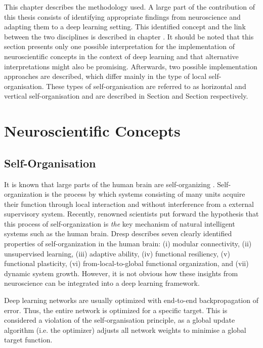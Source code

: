 This chapter describes the methodology used.
A large part of the contribution of this thesis consists of identifying appropriate findings from neuroscience and adapting them to a deep learning setting.
This identified concept and the link between the two disciplines is described in chapter .
It should be noted that this section presents only one possible interpretation for the implementation of neuroscientific concepts in the context of deep learning and that alternative interpretations might also be promising.
Afterwards, two possible implementation approaches are described, which differ mainly in the type of local self-organisation.
These types of self-organisation are referred to as horizontal and vertical self-organisation and are described in Section  and Section  respectively.




\section{Neuroscientific Concepts}

\subsection{Self-Organisation}
It is known that large parts of the human brain are self-organizing .
Self-organization is the process by which systems consisting of many units acquire their function through local interaction and without interference from a external supervisory system.
Recently, renowned scientists  put forward the hypothesis that this process of self-organization is \emph{the} key mechanism of natural intelligent systems such as the human brain.
Dresp  describes seven clearly identified properties of self-organization in the human brain: (i) modular connectivity, (ii) unsupervised learning, (iii) adaptive ability, (iv) functional resiliency, (v) functional plasticity, (vi) from-local-to-global functional organization, and (vii) dynamic system growth.
However, it is not obvious how these insights from neuroscience can be integrated into a deep learning framework.

Deep learning networks are usually optimized with end-to-end backpropagation of error.
Thus, the entire network is optimized for a specific target.
This is considered a violation of the self-organisation principle, as a global update algorithm (i.e. the optimizer) adjusts all network weights to minimise a global target function.


